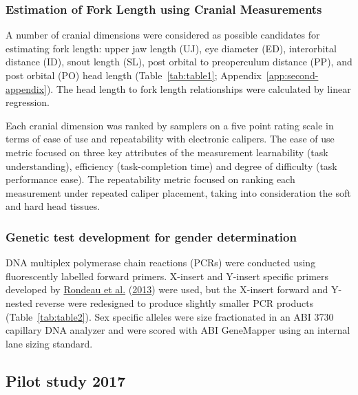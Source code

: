 \documentclass[12pt]{article}\usepackage[]{graphicx}\usepackage[]{color}
\begin{document}
\hypertarget{estimation-of-fork-length-using-cranial-measurements}{%
\subsubsection{Estimation of Fork Length using Cranial Measurements}\label{estimation-of-fork-length-using-cranial-measurements}}

A number of cranial dimensions were considered as possible candidates for estimating fork length: upper jaw length (UJ), eye diameter (ED), interorbital distance (ID), snout length (SL), post orbital to preoperculum distance (PP), and post orbital (PO) head length (Table~\ref{tab:table1}; Appendix~\ref{app:second-appendix}). The head length to fork length relationships were calculated by linear regression.

Each cranial dimension was ranked by samplers on a five point rating scale in terms of ease of use and repeatability with electronic calipers. The ease of use metric focused on three key attributes of the measurement learnability (task understanding), efficiency (task-completion time) and degree of difficulty (task performance ease). The repeatability metric focused on ranking each measurement under repeated caliper placement, taking into consideration the soft and hard head tissues.

\hypertarget{genetic-test-development-for-gender-determination}{%
\subsubsection{Genetic test development for gender determination}\label{genetic-test-development-for-gender-determination}}

DNA multiplex polymerase chain reactions (PCRs) were conducted using fluorescently labelled forward primers. X-insert and Y-insert specific primers developed by \protect\hyperlink{ref-Rondeau2013}{Rondeau et al.} (\protect\hyperlink{ref-Rondeau2013}{2013}) were used, but the X-insert forward and Y-nested reverse were redesigned to produce slightly smaller PCR products (Table~\ref{tab:table2}). Sex specific alleles were size fractionated in an ABI 3730 capillary DNA analyzer and were scored with ABI GeneMapper using an internal lane sizing standard.

\hypertarget{pilot-study-2017}{%
\subsection{Pilot study 2017}\label{pilot-study-2017}}
\end{document}
